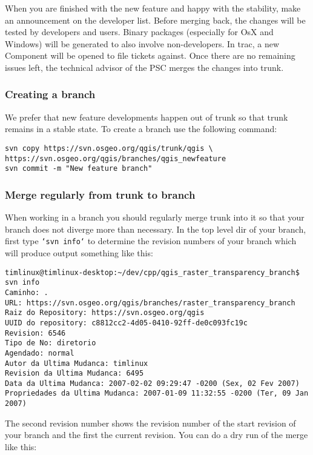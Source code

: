 When you are finished with the new feature and happy with the stability, make an announcement on the developer list. 
Before merging back, the changes will be tested by developers and users. Binary packages (especially for OsX and Windows) 
will be generated to also involve non-developers. In trac, a new Component will be opened to file tickets against. 
Once there are no remaining issues left, the technical advisor of the PSC merges the changes into trunk.

\subsubsection{Creating a branch}
We prefer that new feature developments happen out of trunk so that trunk remains in a 
stable state. To create a branch use the following command:

\begin{verbatim}
svn copy https://svn.osgeo.org/qgis/trunk/qgis \
https://svn.osgeo.org/qgis/branches/qgis_newfeature
svn commit -m "New feature branch"
\end{verbatim}

\subsubsection{Merge regularly from trunk to branch}
When working in a branch you should regularly merge trunk into it so that your branch does not diverge more 
than necessary. In the top level dir of your branch, first type \texttt{`svn info`} to determine the revision 
numbers of your branch which will produce output something like this:

\begin{verbatim}
timlinux@timlinux-desktop:~/dev/cpp/qgis_raster_transparency_branch$ svn info
Caminho: .
URL: https://svn.osgeo.org/qgis/branches/raster_transparency_branch
Raiz do Repository: https://svn.osgeo.org/qgis
UUID do repository: c8812cc2-4d05-0410-92ff-de0c093fc19c
Revision: 6546
Tipo de No: diretorio
Agendado: normal
Autor da Ultima Mudanca: timlinux
Revision da Ultima Mudanca: 6495
Data da Ultima Mudanca: 2007-02-02 09:29:47 -0200 (Sex, 02 Fev 2007)
Propriedades da Ultima Mudanca: 2007-01-09 11:32:55 -0200 (Ter, 09 Jan 2007)
\end{verbatim}

The second revision number shows the revision number of the start revision of your branch and the first the 
current revision. You can do a dry run of the merge like this:

